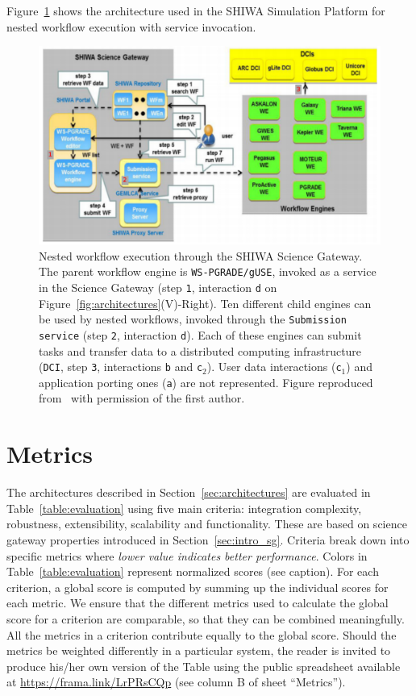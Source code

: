 \documentclass[preprint,3p,twocolumn]{elsarticle}
\newcommand{\correction}[1]{\color{blue}#1\color{black}\xspace}
\begin{document}
Figure~\ref{fig:shiwa-architecture} shows the architecture
used in the SHIWA Simulation Platform for nested workflow execution
with service invocation.
\begin{figure}
\centering
\includegraphics[width=1.5\columnwidth]{figures/shiwa-science-gateway.pdf}
\caption{Nested workflow execution through the SHIWA Science Gateway. The
  parent workflow engine is \texttt{WS-PGRADE/gUSE}, invoked as a service
  in the Science Gateway (step \texttt{1}, interaction \texttt{d} on
  Figure~\ref{fig:architectures}(V)-Right). Ten different child engines can be used by nested
  workflows, invoked through the \texttt{Submission service} (step
  \texttt{2}, interaction \texttt{d}). Each of these engines can
  submit tasks and transfer data to a distributed computing
  infrastructure (\texttt{DCI}, step \texttt{3}, interactions
  \texttt{b} and \texttt{c$_2$}). User data interactions (\texttt{c$_1$}) and
  application porting ones (\texttt{a}) are not represented. Figure
  reproduced from~\cite{terstyanszky2014enabling} with permission of
  the first author.}
\label{fig:shiwa-architecture}
\end{figure}


\section{\correction{Metrics}}

\label{sec:metrics}

The architectures described in Section~\ref{sec:architectures} are
evaluated in Table~\ref{table:evaluation} using five main criteria:
integration complexity, robustness, extensibility, scalability and
\correction{functionality}. These are based on science gateway properties
introduced in Section~\ref{sec:intro_sg}. Criteria break down into
specific metrics where \emph{lower value indicates better
  performance}. Colors in Table~\ref{table:evaluation} represent
normalized scores (see caption). For each criterion, a global score is
computed by summing up the individual scores for each metric. We
ensure that the different metrics used to calculate the global score
for a criterion are comparable, so that they can be combined
meaningfully. \correction{All the metrics in a criterion contribute
  equally to the global score. Should the metrics be weighted
  differently in a particular system, the reader is invited to produce
  his/her own version of the Table using the public spreadsheet
  available at \url{https://frama.link/LrPRsCQp} (see column B of
  sheet ``Metrics'').}
\end{document}
